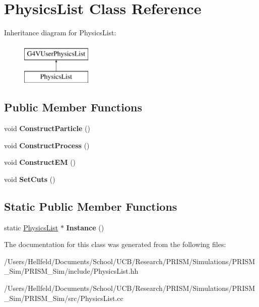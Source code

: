 \hypertarget{class_physics_list}{}\section{Physics\+List Class Reference}
\label{class_physics_list}
Inheritance diagram for Physics\+List\+:\begin{figure}[H]
\begin{center}
\leavevmode
\includegraphics[height=2.000000cm]{class_physics_list}
\end{center}
\end{figure}
\subsection*{Public Member Functions}
\begin{DoxyCompactItemize}
\item 
\hypertarget{class_physics_list_af7906507122c985d2da3e61c56efe60e}{}\label{class_physics_list_af7906507122c985d2da3e61c56efe60e} 
void {\bfseries Construct\+Particle} ()
\item 
\hypertarget{class_physics_list_a9c08bc28eba2ae62104b967280901a3f}{}\label{class_physics_list_a9c08bc28eba2ae62104b967280901a3f} 
void {\bfseries Construct\+Process} ()
\item 
\hypertarget{class_physics_list_a42728fc670ddaf9404a9e023f5843c73}{}\label{class_physics_list_a42728fc670ddaf9404a9e023f5843c73} 
void {\bfseries Construct\+EM} ()
\item 
\hypertarget{class_physics_list_a0ba901b82ae30657b109930645fe8017}{}\label{class_physics_list_a0ba901b82ae30657b109930645fe8017} 
void {\bfseries Set\+Cuts} ()
\end{DoxyCompactItemize}
\subsection*{Static Public Member Functions}
\begin{DoxyCompactItemize}
\item 
\hypertarget{class_physics_list_ad9d6ed1c4ba56c39fbd5a9c29614635c}{}\label{class_physics_list_ad9d6ed1c4ba56c39fbd5a9c29614635c} 
static \hyperlink{class_physics_list}{Physics\+List} $\ast$ {\bfseries Instance} ()
\end{DoxyCompactItemize}


The documentation for this class was generated from the following files\+:\begin{DoxyCompactItemize}
\item 
/\+Users/\+Hellfeld/\+Documents/\+School/\+U\+C\+B/\+Research/\+P\+R\+I\+S\+M/\+Simulations/\+P\+R\+I\+S\+M\+\_\+\+Sim/\+P\+R\+I\+S\+M\+\_\+\+Sim/include/Physics\+List.\+hh\item 
/\+Users/\+Hellfeld/\+Documents/\+School/\+U\+C\+B/\+Research/\+P\+R\+I\+S\+M/\+Simulations/\+P\+R\+I\+S\+M\+\_\+\+Sim/\+P\+R\+I\+S\+M\+\_\+\+Sim/src/Physics\+List.\+cc\end{DoxyCompactItemize}

